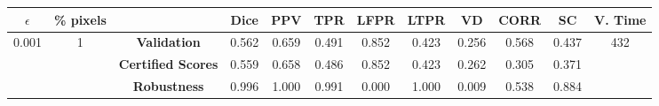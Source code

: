 \begin{longtable}{ c  c | c | c  c  c  c  c  c  c c c}
\toprule \textbf{$\epsilon$} & \textbf{\% pixels} & & \textbf{Dice} & \textbf{PPV} & \textbf{TPR} & \textbf{LFPR} & \textbf{LTPR} & \textbf{VD} & \textbf{CORR} & \textbf{SC} & \textbf{V. Time} \\
\midrule 
\multirow{3}{*}{0.001}  & \multirow{3}{*}{1} &\textbf{Validation} & 0.562 & 0.659 & 0.491 & 0.852 & 0.423 & 0.256 & 0.568 & 0.437 & \multirow{3}{*}{432} \\
 & & \textbf{Certified Scores} & 0.559 & 0.658 & 0.486 & 0.852 & 0.423 & 0.262 & 0.305 & 0.371 & \\
& & \textbf{Robustness} & 0.996 & 1.000 & 0.991 & 0.000 & 1.000 & 0.009 & 0.538 & 0.884 & \\
\end{longtable}